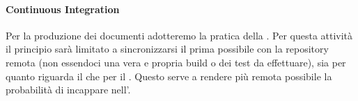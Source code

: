 
			
			

			\paragraph{Continuous Integration}\label{ContinuousIntegration}
			Per la produzione dei documenti adotteremo la pratica della .
			Per questa attività il principio sarà limitato a sincronizzarsi il prima possibile con la repository remota (non essendoci una vera e propria build o dei test da effettuare),
			sia per quanto riguarda il  che per il .
			Questo serve a rendere più remota possibile la probabilità di incappare nell'.

